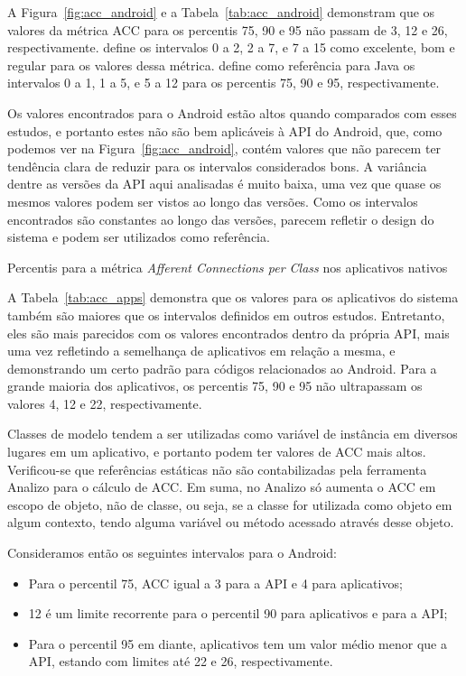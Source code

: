 A Figura~\ref{fig:acc_android} e a Tabela~\ref{tab:acc_android} demonstram que os valores da métrica ACC para os percentis 75, 90 e 95 não passam de 3, 12 e 26, respectivamente.  define os intervalos 0 a 2, 2 a 7, e 7 a 15 como excelente, bom e regular para os valores dessa métrica.  define como referência para Java os intervalos 0 a 1, 1 a 5, e 5 a 12 para os percentis 75, 90 e 95, respectivamente.

Os valores encontrados para o Android estão altos quando comparados com esses estudos, e portanto estes não são bem aplicáveis à API do Android, que, como podemos ver na Figura~\ref{fig:acc_android}, contém valores que não parecem ter tendência clara de reduzir para os intervalos considerados bons. A variância dentre as versões da API aqui analisadas é muito baixa, uma vez que quase os mesmos valores podem ser vistos ao longo das versões. Como os intervalos encontrados são constantes ao longo das versões, parecem refletir o design do sistema e podem ser utilizados como referência.

\begin{table}[!htb]
\centering
{}

\caption{Percentis para a métrica \textit{Afferent Connections per Class} nos aplicativos nativos}
\label{tab:acc_apps}
\end{table}

A Tabela~\ref{tab:acc_apps} demonstra que os valores para os aplicativos do sistema também são maiores que os intervalos definidos em outros estudos. Entretanto, eles são mais parecidos com os valores encontrados dentro da própria API, mais uma vez refletindo a semelhança de aplicativos em relação a mesma, e demonstrando um certo padrão para códigos relacionados ao Android. Para a grande maioria dos aplicativos, os percentis 75, 90 e 95 não ultrapassam os valores 4, 12 e 22, respectivamente.

Classes de modelo tendem a ser utilizadas como variável de instância em diversos lugares em um aplicativo, e portanto podem ter valores de ACC mais altos. Verificou-se que referências estáticas não são contabilizadas pela ferramenta Analizo para o cálculo de ACC. Em suma, no Analizo só aumenta o ACC em escopo de objeto, não de classe, ou seja, se a classe for utilizada como objeto em algum contexto, tendo alguma variável ou método acessado através desse objeto.

Consideramos então os seguintes intervalos para o Android:

\begin{itemize}
\item Para o percentil 75, ACC igual a 3 para a API e 4 para aplicativos;
\item 12 é um limite recorrente para o percentil 90 para aplicativos e para a API;
\item Para o percentil 95 em diante, aplicativos tem um valor médio menor que a API, estando com limites até 22 e 26, respectivamente.
\end{itemize}

